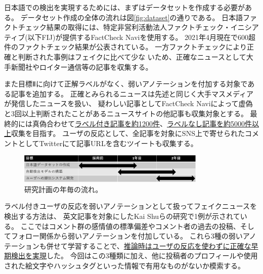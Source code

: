 
\vspace{20pt}
日本語での検出を実現するためには、まずはデータセットを作成する必要がある。
データセット作成の全体の流れは図\ref{fig:dataset}の通りである。
日本語ファクトチェック結果の取得には、特定非営利活動法人ファクトチェック・イニシアティブ(以下FIJ)が提供するFactCheck Naviを使用する。
2021年4月現在で600超件のファクトチェック結果が公表されている。%
一方ファクトチェックにより正確と判断された事例はフェイクに比べて少な%
いため、正確なニュースとして大手新聞社やロイター通信等の記事を収集する。

また目標Ⅱに向けて正解ラベルがなく、弱いアノテーションを付加する対象である記事を追加する。
正確とみられるニュースは先述と同じく大手マスメディアが発信したニュースを扱い、
疑わしい記事としてFactCheck Naviによって虚偽と3回以上判断されたことがあるニュースサイトの他記事も収集対象とする。
最終的には真偽合わせて\underline{ラベル付き記事を約1200件}、\underline{ラベルなし記事を約5000件以上}収集を目指す。
ユーザの反応として、全記事を対象にSNS上で寄せられたコメントとしてTwitterにて記事URLを含むツイートも収集する。

\setlength\intextsep{0pt}
\setlength\textfloatsep{0pt}
\begin{figure}
    \centering
    \includegraphics[width=0.8\textwidth]{figs/plan.pdf}
    \vspace{-1cm} 
    \caption{研究計画の年毎の流れ。}
    \label{fig:plan}
\end{figure}
ラベル付きユーザの反応を弱いアノテーションとして扱ってフェイクニュースを検出する方法は、
英文記事を対象にしたKai Shuらの研究で1例が示されている\cite{shu2020leveraging}。
ここではコメント群の感情値の標準偏差やコメント者の過去の投稿、そしてフォロー関係から弱いアノテーションを付加している。
これら3種の弱いアノテーションも併せて学習することで、\underline{推論時はユーザの反応を使わずに正確な早期検出を実現}した。
今回はこの3種類に加え、他に投稿者のプロフィールや使用された絵文字やハッシュタグといった情報で有用なものがないか模索する。

